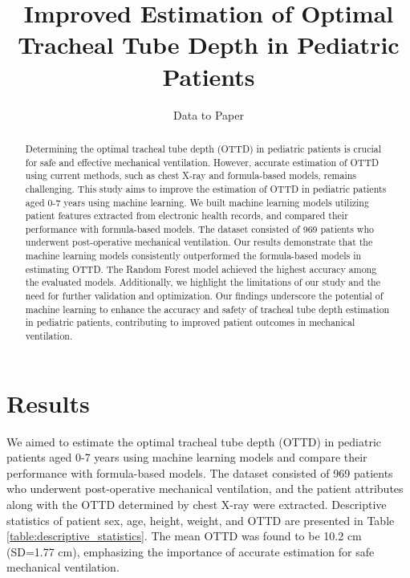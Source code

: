 \documentclass[11pt]{article}
\title{Improved Estimation of Optimal Tracheal Tube Depth in Pediatric Patients}
\author{Data to Paper}
\begin{document}
\maketitle
\begin{abstract}
Determining the optimal tracheal tube depth (OTTD) in pediatric patients is crucial for safe and effective mechanical ventilation. However, accurate estimation of OTTD using current methods, such as chest X-ray and formula-based models, remains challenging. This study aims to improve the estimation of OTTD in pediatric patients aged 0-7 years using machine learning. We built machine learning models utilizing patient features extracted from electronic health records, and compared their performance with formula-based models. The dataset consisted of 969 patients who underwent post-operative mechanical ventilation. Our results demonstrate that the machine learning models consistently outperformed the formula-based models in estimating OTTD. The Random Forest model achieved the highest accuracy among the evaluated models. Additionally, we highlight the limitations of our study and the need for further validation and optimization. Our findings underscore the potential of machine learning to enhance the accuracy and safety of tracheal tube depth estimation in pediatric patients, contributing to improved patient outcomes in mechanical ventilation.
\end{abstract}
\section*{Results}

We aimed to estimate the optimal tracheal tube depth (OTTD) in pediatric patients aged 0-7 years using machine learning models and compare their performance with formula-based models. The dataset consisted of 969 patients who underwent post-operative mechanical ventilation, and the patient attributes along with the OTTD determined by chest X-ray were extracted. Descriptive statistics of patient sex, age, height, weight, and OTTD are presented in Table {}\ref{table:descriptive_statistics}. The mean OTTD was found to be 10.2 cm (SD=1.77 cm), emphasizing the importance of accurate estimation for safe mechanical ventilation.
\end{document}
